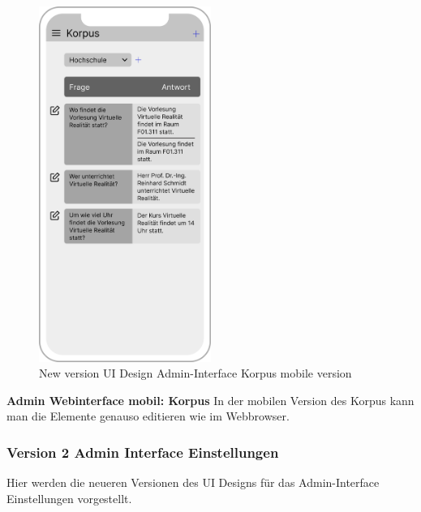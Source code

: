 \begin{figure}[H]
    \centering
    \includegraphics[width=0.5\textwidth]{bilder/new vers. UI Design/Korpus/iPhone X Korpus I.png}
    \caption{New version UI Design Admin-Interface Korpus mobile version}
    \label{fig:New version UI Design Admin-Interface Korpus mobile version}
\end{figure}
\noindent \textbf{Admin Webinterface mobil: Korpus} \newline
In der mobilen Version des Korpus kann man die Elemente genauso editieren wie im Webbrowser.

\subsubsection{Version 2 Admin Interface Einstellungen}
Hier werden die neueren Versionen des UI Designs für das Admin-Interface Einstellungen vorgestellt.


